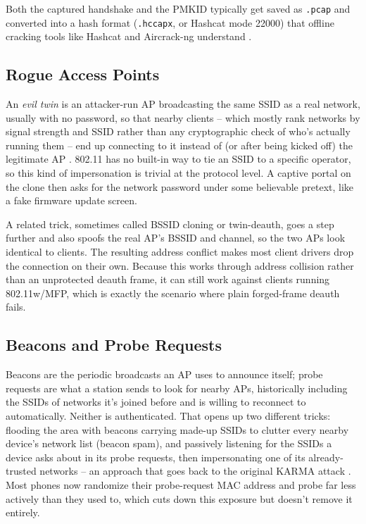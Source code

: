 \documentclass[conference]{IEEEtran}
\begin{document}
Both the captured handshake and the PMKID typically get saved as \texttt{.pcap} and converted into a hash format (\texttt{.hccapx}, or Hashcat mode 22000) that offline cracking tools like Hashcat and Aircrack-ng understand \cite{hashcat}.

\subsection{Rogue Access Points}

An \emph{evil twin} is an attacker-run AP broadcasting the same SSID as a real network, usually with no password, so that nearby clients -- which mostly rank networks by signal strength and SSID rather than any cryptographic check of who's actually running them -- end up connecting to it instead of (or after being kicked off) the legitimate AP \cite{eviltwin}. 802.11 has no built-in way to tie an SSID to a specific operator, so this kind of impersonation is trivial at the protocol level. A captive portal on the clone then asks for the network password under some believable pretext, like a fake firmware update screen.

A related trick, sometimes called BSSID cloning or twin-deauth, goes a step further and also spoofs the real AP's BSSID and channel, so the two APs look identical to clients. The resulting address conflict makes most client drivers drop the connection on their own. Because this works through address collision rather than an unprotected deauth frame, it can still work against clients running 802.11w/MFP, which is exactly the scenario where plain forged-frame deauth fails.

\subsection{Beacons and Probe Requests}

Beacons are the periodic broadcasts an AP uses to announce itself; probe requests are what a station sends to look for nearby APs, historically including the SSIDs of networks it's joined before and is willing to reconnect to automatically. Neither is authenticated. That opens up two different tricks: flooding the area with beacons carrying made-up SSIDs to clutter every nearby device's network list (beacon spam), and passively listening for the SSIDs a device asks about in its probe requests, then impersonating one of its already-trusted networks -- an approach that goes back to the original KARMA attack \cite{karma}. Most phones now randomize their probe-request MAC address and probe far less actively than they used to, which cuts down this exposure but doesn't remove it entirely.
\end{document}
